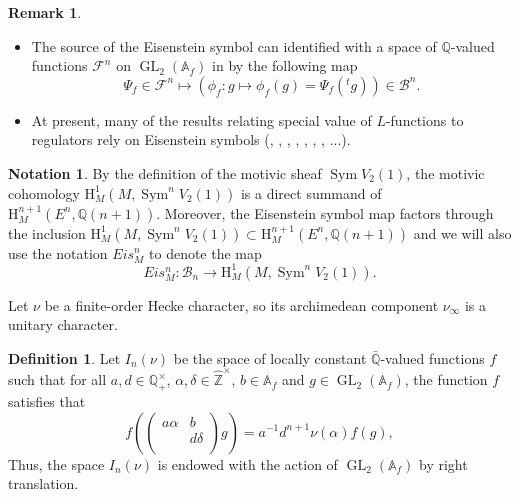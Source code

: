 \documentclass[11pt, a4paper]{amsart}
\theoremstyle{plain}
\theoremstyle{definition}
\newtheorem{definition}[theorem]{Definition}
\newtheorem{remark}[theorem]{Remark}
\newtheorem{notation}[theorem]{Notation}
\numberwithin{equation}{section}
\def\AAA{\mathbb{A}}
\def\QQ{\mathbb{Q}}
\def\ZZ{\mathbb{Z}}
\DeclareMathOperator{\Sym}{Sym}
\DeclareMathOperator{\GL}{\mathrm{GL}}
\begin{document}
\begin{remark}
    \begin{itemize}
    \item 
        The source of the Eisenstein symbol can identified with a space of $\QQ$-valued functions $\mathcal{F}^{n}$ on $\GL_2(\AAA_f)$ in \cite[2.1.2, P7]{Beilinson_Modular_Curve} by the following map
        \begin{equation*}
            \Psi_f \in \mathcal{F}^{n} \mapsto (\phi_f \colon g \mapsto \phi_f(g) = \Psi_f(^{t}g)) \in \mathcal{B}^{n}. 
        \end{equation*}
    \item At present, many of the results relating special value of $L$-functions to regulators rely on Eisenstein symbols (\cite{Beilinson_Modular_Curve}, \cite{Deninger89}, \cite{Deninger90}, \cite{Kings98}, \cite{LemmaI15}, \cite{LemmaII17}, \cite{Kato04}, ...).
    \end{itemize}
\end{remark}

\begin{notation}
    By the definition of the motivic sheaf $\Sym V_2(1)$, the motivic cohomology $\mathrm{H}_{M}^{1}(M, \Sym^{n} V_{2}(1))$ is a direct summand of $\mathrm{H}_{M}^{n + 1}(E^n, \QQ(n + 1))$. Moreover, the Eisenstein symbol map factors through the inclusion $\mathrm{H}_{M}^{1}(M, \Sym^{n} V_{2}(1)) \subset \mathrm{H}_{M}^{n + 1}(E^n, \QQ(n + 1))$ and we will also use the notation $Eis_{M}^{n}$ to denote the map
    \begin{equation*}
        Eis_{M}^{n} \colon \mathcal{B}_{n} \longrightarrow \mathrm{H}_{M}^{1}(M, \Sym^{n} V_{2}(1)). 
    \end{equation*}
\end{notation}

Let $\nu$ be a finite-order Hecke character, so its archimedean component $\nu_{\infty}$ is a unitary character. 

\begin{definition}
\label{Def: In(v)}
Let $I_{n}(\nu)$ be the space of locally constant $\bar{\QQ}$-valued functions $f$ such that for all $a, d \in \QQ_{+}^{\times}$, $\alpha, \delta \in \hat{\ZZ}^{\times}$, $b \in \AAA_f$ and $g \in \GL_2(\AAA_f)$, 
          the function $f$ satisfies that 
          \begin{equation}
          \label{eq: In(v) action}
              f(\begin{pmatrix}
                  a\alpha & b \\ 
                          & d\delta \\
                \end{pmatrix}g) = a^{-1}d^{n + 1}\nu(\alpha)f(g), 
          \end{equation}
Thus, the space $I_n(\nu)$ is endowed with the action of $\GL_2(\AAA_f)$ by right translation. 
\end{definition}
\end{document}
